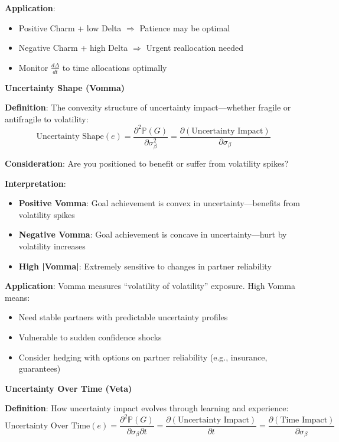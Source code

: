 \textbf{Application}: 
\begin{itemize}
\item Positive Charm + low Delta $\Rightarrow$ Patience may be optimal
\item Negative Charm + high Delta $\Rightarrow$ Urgent reallocation needed
\item Monitor $\frac{d\Delta}{dt}$ to time allocations optimally
\end{itemize}

\textbf{Uncertainty Shape (Vomma)}

\textbf{Definition}: The convexity structure of uncertainty impact---whether fragile or antifragile to volatility:
\[ \text{Uncertainty Shape}(e) = \frac{\partial^2 \mathbb{P}(G)}{\partial \sigma_\beta^2} = \frac{\partial (\text{Uncertainty Impact})}{\partial \sigma_\beta} \]

\textbf{Consideration}: Are you positioned to benefit or suffer from volatility spikes?

\textbf{Interpretation}:
\begin{itemize}
\item \textbf{Positive Vomma}: Goal achievement is convex in uncertainty---benefits from volatility spikes
\item \textbf{Negative Vomma}: Goal achievement is concave in uncertainty---hurt by volatility increases
\item \textbf{High |Vomma|}: Extremely sensitive to changes in partner reliability
\end{itemize}

\textbf{Application}: Vomma measures ``volatility of volatility'' exposure. High Vomma means:
\begin{itemize}
\item Need stable partners with predictable uncertainty profiles
\item Vulnerable to sudden confidence shocks
\item Consider hedging with options on partner reliability (e.g., insurance, guarantees)
\end{itemize}

\textbf{Uncertainty Over Time (Veta)}

\textbf{Definition}: How uncertainty impact evolves through learning and experience:
\[ \text{Uncertainty Over Time}(e) = \frac{\partial^2 \mathbb{P}(G)}{\partial \sigma_\beta \partial t} = \frac{\partial (\text{Uncertainty Impact})}{\partial t} = \frac{\partial (\text{Time Impact})}{\partial \sigma_\beta} \]

